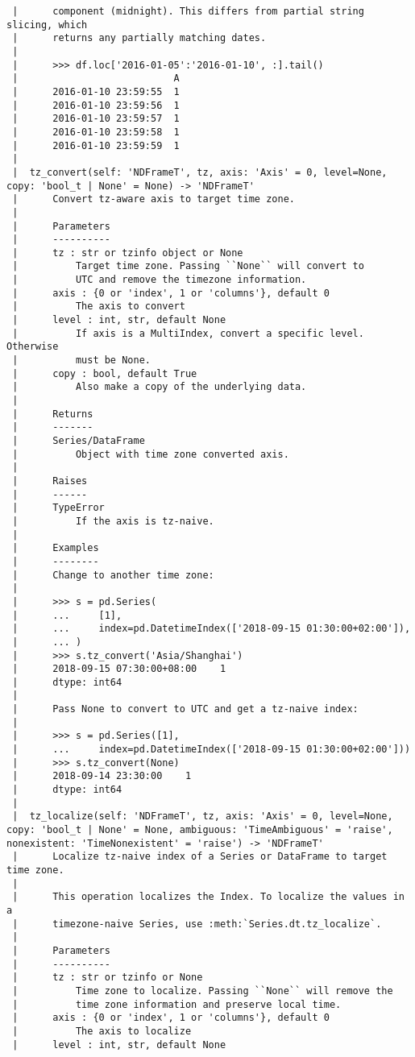 \documentclass[
  letterpaper,
  DIV=11,
  numbers=noendperiod]{scrreprt}
\begin{document}
\begin{verbatim}
 |      component (midnight). This differs from partial string slicing, which
 |      returns any partially matching dates.
 |      
 |      >>> df.loc['2016-01-05':'2016-01-10', :].tail()
 |                           A
 |      2016-01-10 23:59:55  1
 |      2016-01-10 23:59:56  1
 |      2016-01-10 23:59:57  1
 |      2016-01-10 23:59:58  1
 |      2016-01-10 23:59:59  1
 |  
 |  tz_convert(self: 'NDFrameT', tz, axis: 'Axis' = 0, level=None, copy: 'bool_t | None' = None) -> 'NDFrameT'
 |      Convert tz-aware axis to target time zone.
 |      
 |      Parameters
 |      ----------
 |      tz : str or tzinfo object or None
 |          Target time zone. Passing ``None`` will convert to
 |          UTC and remove the timezone information.
 |      axis : {0 or 'index', 1 or 'columns'}, default 0
 |          The axis to convert
 |      level : int, str, default None
 |          If axis is a MultiIndex, convert a specific level. Otherwise
 |          must be None.
 |      copy : bool, default True
 |          Also make a copy of the underlying data.
 |      
 |      Returns
 |      -------
 |      Series/DataFrame
 |          Object with time zone converted axis.
 |      
 |      Raises
 |      ------
 |      TypeError
 |          If the axis is tz-naive.
 |      
 |      Examples
 |      --------
 |      Change to another time zone:
 |      
 |      >>> s = pd.Series(
 |      ...     [1],
 |      ...     index=pd.DatetimeIndex(['2018-09-15 01:30:00+02:00']),
 |      ... )
 |      >>> s.tz_convert('Asia/Shanghai')
 |      2018-09-15 07:30:00+08:00    1
 |      dtype: int64
 |      
 |      Pass None to convert to UTC and get a tz-naive index:
 |      
 |      >>> s = pd.Series([1],
 |      ...     index=pd.DatetimeIndex(['2018-09-15 01:30:00+02:00']))
 |      >>> s.tz_convert(None)
 |      2018-09-14 23:30:00    1
 |      dtype: int64
 |  
 |  tz_localize(self: 'NDFrameT', tz, axis: 'Axis' = 0, level=None, copy: 'bool_t | None' = None, ambiguous: 'TimeAmbiguous' = 'raise', nonexistent: 'TimeNonexistent' = 'raise') -> 'NDFrameT'
 |      Localize tz-naive index of a Series or DataFrame to target time zone.
 |      
 |      This operation localizes the Index. To localize the values in a
 |      timezone-naive Series, use :meth:`Series.dt.tz_localize`.
 |      
 |      Parameters
 |      ----------
 |      tz : str or tzinfo or None
 |          Time zone to localize. Passing ``None`` will remove the
 |          time zone information and preserve local time.
 |      axis : {0 or 'index', 1 or 'columns'}, default 0
 |          The axis to localize
 |      level : int, str, default None

\end{verbatim}
\end{document}
